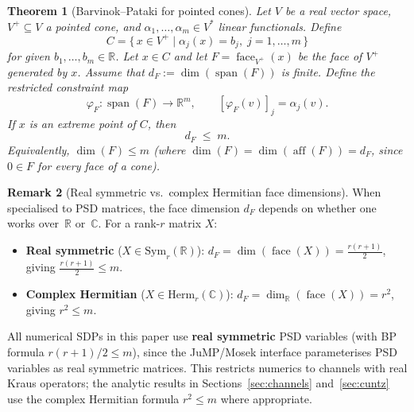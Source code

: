 \documentclass[11pt,a4paper]{article}
\newtheorem{theorem}{Theorem}
\theoremstyle{definition}
\newtheorem{remark}[theorem]{Remark}
\newcommand{\R}{\mathbb{R}}
\newcommand{\aff}{\operatorname{aff}}
\newcommand{\spn}{\operatorname{span}}
\newcommand{\face}{\operatorname{face}}
\newcommand{\Sym}{\mathrm{Sym}}
\begin{document}
\begin{theorem}[Barvinok--Pataki for pointed cones]\label{thm:general}
Let $V$ be a real vector space, $V^+\subseteq V$ a pointed cone, and
$\alpha_1, \dots, \alpha_m \in V^*$ linear functionals.  Define
\[
  C = \bigl\{\, x \in V^+ \;\big|\;
    \alpha_j(x) = b_j,\; j = 1, \dots, m \,\bigr\}
\]
for given $b_1, \dots, b_m \in \R$.  Let $x \in C$ and let
$F = \face_{V^+}(x)$ be the face of $V^+$ generated by $x$.
Assume that $d_F := \dim(\spn(F))$ is finite.  Define the restricted
constraint map
\[
  \varphi_F \colon \spn(F) \to \R^m, \qquad
  [\varphi_F(v)]_j = \alpha_j(v).
\]
If $x$ is an extreme point of $C$, then
\[
  \boxed{\; d_F \;\leq\; m. \;}
\]
Equivalently, $\dim(F) \leq m$ (where $\dim(F) = \dim(\aff(F))
= d_F$, since $0 \in F$ for every face of a cone).
\end{theorem}

\begin{remark}[Real symmetric vs.\ complex Hermitian face dimensions]
\label{rmk:real-vs-complex}
When specialised to PSD matrices, the face dimension $d_F$ depends
on whether one works over~$\R$ or~$\mathbb{C}$.  For a rank-$r$
matrix $X$:
\begin{itemize}
\item \textbf{Real symmetric} ($X \in \Sym_r(\R)$):
  $d_F = \dim(\face(X)) = \frac{r(r+1)}{2}$, giving
  $\frac{r(r+1)}{2} \leq m$.
\item \textbf{Complex Hermitian} ($X \in \mathrm{Herm}_r(\mathbb{C})$):
  $d_F = \dim_\R(\face(X)) = r^2$, giving $r^2 \leq m$.
\end{itemize}
All numerical SDPs in this paper use \textbf{real symmetric}
PSD variables (with BP formula $r(r{+}1)/2 \leq m$), since the
JuMP/Mosek interface parameterises PSD variables as real symmetric
matrices.  This restricts numerics to channels with real Kraus
operators; the analytic results in Sections~\ref{sec:channels}
and~\ref{sec:cuntz} use the complex Hermitian formula $r^2 \leq m$
where appropriate.
\end{remark}
\end{document}
